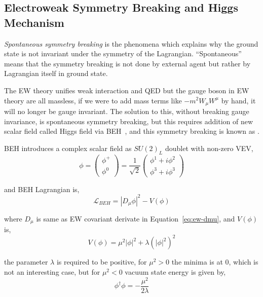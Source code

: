 \subsection{
  Electroweak Symmetry Breaking and Higgs Mechanism
}\label{ch_intro:ewsb}

\textit{Spontaneous symmetry breaking} is the phenomena which explains
why the ground state is not invariant under the symmetry
of the Lagrangian. ``Spontaneous'' means that the symmetry
breaking is not done by external agent but rather by Lagrangian itself
in ground state.

The \gls{EW} theory unifies weak interaction and \gls{QED} but the
gauge boson in \gls{EW} theory are all massless, if we were to add mass
terms like \( - m^{2} W_{\mu} W^{\mu} \) by hand, it will no longer
be gauge invariant. The solution to this, without breaking gauge invariance,
is spontaneous symmetry breaking, but this requires addition of new scalar
field called Higgs field via \gls{BEH}~\cite{Englert1964,Higgs1964}, and this
symmetry breaking is known as .

\gls{BEH} introduces a complex scalar field as \( {SU(2)}_L \)
doublet with non-zero \gls{VEV},
%
\begin{equation}
  \phi = \left( \begin{matrix}
      \phi^{+} \\
      \phi^{0}
    \end{matrix} \right)
  = \frac{1}{\sqrt{2}}
  \left( \begin{matrix}
      \phi^{1} + i \phi^{2} \\
      \phi^{3} + i \phi^{3}
    \end{matrix} \right)
\end{equation}

and \gls{BEH} Lagrangian is,
%
\begin{equation}
  \mathcal{L}_{BEH} = {| D_{\mu} \phi |}^{2} - V(\phi)
\end{equation}

where \( D_{\mu} \) is same as \gls{EW} covariant derivate
in Equation~\ref{eq:ew-dmu}, and \( V(\phi) \) is,
%
\begin{equation}
  V(\phi) = \mu^{2} |\phi|^{2} + {\lambda (|\phi|^{2})}^{2}
\end{equation}

the parameter \( \lambda \) is required to be positive,
for \( \mu^2 > 0\) the minima is at 0, which is not an interesting case,
but for \( \mu^2 < 0\) vacuum state energy is given by,
%
\begin{equation}
  \phi^{\dagger} \phi = - \frac{\mu^{2}}{2 \lambda}
\end{equation}

